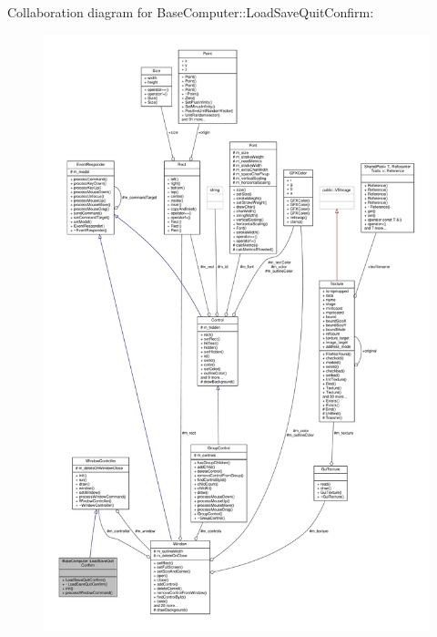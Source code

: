 Collaboration diagram for Base\+Computer\+:\+:Load\+Save\+Quit\+Confirm\+:
\nopagebreak
\begin{figure}[H]
\begin{center}
\leavevmode
\includegraphics[width=350pt]{db/df7/classBaseComputer_1_1LoadSaveQuitConfirm__coll__graph}
\end{center}
\end{figure}
